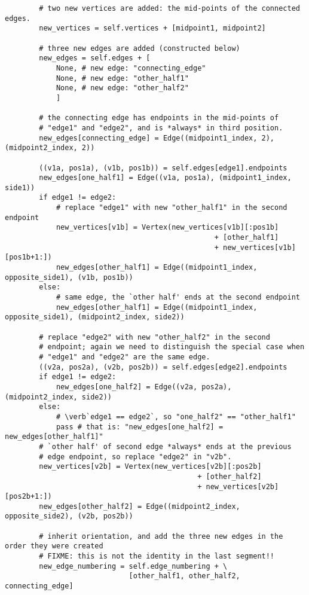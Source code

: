 \begin{lstlisting}
        # two new vertices are added: the mid-points of the connected edges.
        new_vertices = self.vertices + [midpoint1, midpoint2]

        # three new edges are added (constructed below)
        new_edges = self.edges + [
            None, # new edge: "connecting_edge"
            None, # new edge: "other_half1"
            None, # new edge: "other_half2"
            ]
        
        # the connecting edge has endpoints in the mid-points of
        # "edge1" and "edge2", and is *always* in third position.
        new_edges[connecting_edge] = Edge((midpoint1_index, 2), (midpoint2_index, 2))

        ((v1a, pos1a), (v1b, pos1b)) = self.edges[edge1].endpoints
        new_edges[one_half1] = Edge((v1a, pos1a), (midpoint1_index, side1))
        if edge1 != edge2:
            # replace "edge1" with new "other_half1" in the second endpoint
            new_vertices[v1b] = Vertex(new_vertices[v1b][:pos1b]
                                                 + [other_half1]
                                                 + new_vertices[v1b][pos1b+1:])
            new_edges[other_half1] = Edge((midpoint1_index, opposite_side1), (v1b, pos1b))
        else:
            # same edge, the `other half' ends at the second endpoint
            new_edges[other_half1] = Edge((midpoint1_index, opposite_side1), (midpoint2_index, side2))

        # replace "edge2" with new "other_half2" in the second
        # endpoint; again we need to distinguish the special case when
        # "edge1" and "edge2" are the same edge.
        ((v2a, pos2a), (v2b, pos2b)) = self.edges[edge2].endpoints
        if edge1 != edge2:
            new_edges[one_half2] = Edge((v2a, pos2a), (midpoint2_index, side2))
        else:
            # \verb`edge1 == edge2`, so "one_half2" == "other_half1"
            pass # that is: "new_edges[one_half2] = new_edges[other_half1]"
        # `other half' of second edge *always* ends at the previous
        # edge endpoint, so replace "edge2" in "v2b".
        new_vertices[v2b] = Vertex(new_vertices[v2b][:pos2b]
                                             + [other_half2]
                                             + new_vertices[v2b][pos2b+1:])
        new_edges[other_half2] = Edge((midpoint2_index, opposite_side2), (v2b, pos2b))

        # inherit orientation, and add the three new edges in the order they were created
        # FIXME: this is not the identity in the last segment!!
        new_edge_numbering = self.edge_numbering + \
                             [other_half1, other_half2, connecting_edge]


\end{lstlisting}

